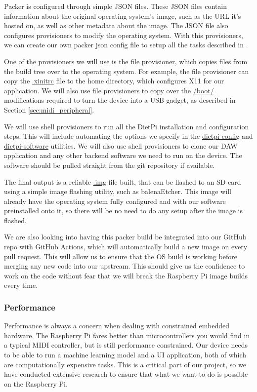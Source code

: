 Packer is configured through simple JSON files. These JSON files contain information about
the original operating system's image, such as the URL it's hosted on, as well as other
metadata about the image. The JSON file also configures provisioners to modify the
operating system. With this provisioners, we can create our own packer json config file to
setup all the tasks described in .

One of the provisioners we will use is the file provisioner, which copies files from the
build tree over to the operating system. For example, the file provisioner can copy the
\url{.xinitrc} file to the home directory, which configures X11 for our application.
We will also use file provisioners to copy over the \url{/boot/} modifications required to
turn the device into a USB gadget, as described in Section \ref{sec:midi_peripheral}.

We will use shell provisioners to run all the DietPi installation and configuration steps.
This will include automating the options we specify in the \url{dietpi-config} and
\url{dietpi-software} utilities. We will also use shell provisioners to clone our DAW
application and any other backend software we need to run on the device. The software
should be pulled straight from the git repository if available.

The final output is a reliable \url{.img} file built, that can be flashed to an SD card
using a simple image flashing utility, such as balenaEtcher. This image will already have
the operating system fully configured and with our software preinstalled onto it, so there
will be no need to do any setup after the image is flashed.

We are also looking into having this packer build be integrated into our GitHub repo with
GitHub Actions, which will automatically build a new image on every pull request. This
will allow us to ensure that the OS build is working before merging any new code into our
upstream. This should give us the confidence to work on the code without fear that we will
break the Raspberry Pi image builds every time.

\subsubsection{Performance}

Performance is always a concern when dealing with constrained embedded hardware. The
Raspberry Pi fares better than microcontrollers you would find in a typical MIDI
controller, but is still performance constrained. Our device needs to be able to run a
machine learning model and a UI application, both of which are computationally expensive
tasks. This is a critical part of our project, so we have conducted extensive research to
ensure that what we want to do is possible on the Raspberry Pi.

